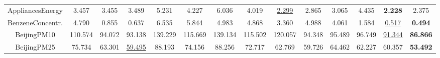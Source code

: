 \documentclass{article} \usepackage{iclr2021_conference,times}
\begin{document}
\begin{table}
\begin{adjustbox}{width=1.2\textwidth,center=\textwidth}
\begin{tabular}{|c|c|c|c|c|c|c|c|c|c|c|c|c|c|}
\hline
AppliancesEnergy                   & 3.457                & 3.455                                                                                      & 3.489                & 5.231                & 4.227                                                                & 6.036                                                                  & 4.019                                                                  & \uline{2.299}        & 2.865                & 3.065                & 4.435               & \textbf{2.228}                                                               & 2.375                                                                          \\
BenzeneConcentr.                   & 4.790                & 0.855                                                                                      & 0.637                & 6.535                & 5.844                                                                & 4.983                                                                  & 4.868                                                                  & 3.360                & 4.988                & 4.061                & 1.584               & \uline{0.517}                                                                & \textbf{0.494}                                                                 \\
BeijingPM10                        & 110.574              & 94.072                                                                                     & 93.138               & 139.229              & 115.669                                                              & 139.134                                                                & 115.502                                                                & 120.057              & 94.348               & 95.489               & 96.749              & \uline{91.344}                                                               & \textbf{86.866}                                                                \\
BeijingPM25                        & 75.734               & 63.301                                                                                     & \uline{59.495}       & 88.193               & 74.156                                                               & 88.256                                                                 & 72.717                                                                 & 62.769               & 59.726               & 64.462               & 62.227              & 60.357                                                                       & \textbf{53.492}                                                                \\

\end{tabular}
\end{adjustbox}
\end{table}
\end{document}
